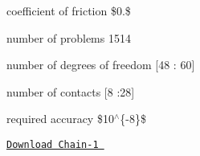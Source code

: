


\begin{DoxyItemize}
\item coefficient of friction \$0.\$  
\item number of problems 1514  
\item number of degrees of freedom \mbox{[}48 \+: 60\mbox{]}  
\item number of contacts \mbox{[}8 \+:28\mbox{]}  
\item required accuracy \$10$^\wedge$\{-\/8\}\$  
\end{DoxyItemize}

\href{./resources/KaplasTower-1.tar.gz}{\tt Download Chain-\/1 } 